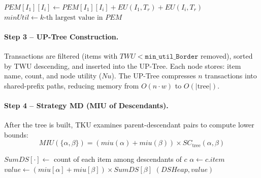 \begin{algorithm}[H]
\caption{PE Strategy --- Pre-Evaluation Matrix (Ref: \texttt{tku/tku.go}, \texttt{preEvaluation}+\texttt{getInitialUtility}, lines 216--311)}
\label{alg:pe}
\begin{algorithmic}[1]
        \State $PEM[I_1][I_i] \leftarrow PEM[I_1][I_i] + EU(I_1, T_r) + EU(I_i, T_r)$
    \EndFor
\EndFor
\State $minUtil \leftarrow k\text{-th largest value in } PEM$
\end{algorithmic}
\end{algorithm}

\paragraph{Step 3 -- UP-Tree Construction.}
Transactions are filtered (items with $TWU < \texttt{min\_util\_Border}$ removed), sorted by TWU descending, and inserted into the UP-Tree. Each node stores: item name, count, and node utility ($Nu$). The UP-Tree compresses $n$ transactions into shared-prefix paths, reducing memory from $O(n \cdot w)$ to $O(|\text{tree}|)$.

\paragraph{Step 4 -- Strategy MD (MIU of Descendants).}
After the tree is built, TKU examines parent-descendant pairs to compute lower bounds:
\begin{equation}
    MIU(\{\alpha, \beta\}) = (miu(\alpha) + miu(\beta)) \times SC_{\text{tree}}(\alpha, \beta)
\end{equation}

\begin{algorithm}[H]
\caption{MD Strategy --- MIU of Descendants (Ref: \texttt{tku/tku.go}, \texttt{runPhase1CandidateGeneration}, lines 126--137)}
\label{alg:md}
\begin{algorithmic}[1]
    \State $SumDS[\cdot] \leftarrow$ count of each item among descendants of $c$
    \State $\alpha \leftarrow c.item$
        \State $value \leftarrow (miu[\alpha] + miu[\beta]) \times SumDS[\beta]$
        \State {}$(DSHeap, value)$ 
    \EndFor
\EndFor
\end{algorithmic}
\end{algorithm}


